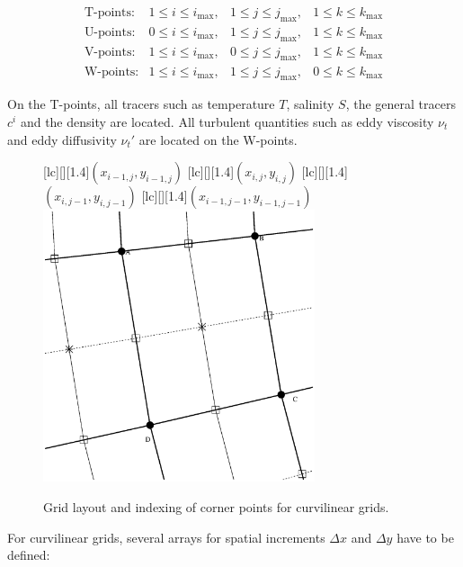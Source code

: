 \begin{equation}\label{imaxjmax}
\begin{array}{llll}
\mbox{T-points:} & 1 \leq i \leq i_{\max}, & 
                   1 \leq j \leq j_{\max}, &
		   1 \leq k \leq k_{\max} \\
\mbox{U-points:} & 0 \leq i \leq i_{\max}, & 
                   1 \leq j \leq j_{\max}, &
		   1 \leq k \leq k_{\max} \\
\mbox{V-points:} & 1 \leq i \leq i_{\max}, & 
                   0 \leq j \leq j_{\max}, &
		   1 \leq k \leq k_{\max} \\
\mbox{W-points:} & 1 \leq i \leq i_{\max}, & 
                   1 \leq j \leq j_{\max}, &
		   0 \leq k \leq k_{\max} 
\end{array}
\end{equation}

On the T-points, all tracers such as\label{TSfirst} 
temperature $T$, salinity $S$,
the general tracers $c^i$ and the density are located. All turbulent
quantities such as eddy viscosity $\nu_t$ and eddy diffusivity $\nu_t'$
are located on the W-points.


\begin{figure}
\begin{center}
[lc][][1.4]{$(x_{i-1,j},y_{i-1,j})$}
[lc][][1.4]{$(x_{i,j},y_{i,j})$}
[lc][][1.4]{$(x_{i,j-1},y_{i,j-1})$}
[lc][][1.4]{$(x_{i-1,j-1},y_{i-1,j-1})$}
\includegraphics[width=8cm,bbllx=50,bblly=50,bburx=543,bbury=556]{./figures/CurviDXDY.ps}
\caption{Grid layout and indexing of corner points for
curvilinear grids. }
\label{fighorgridCurvi}
\end{center}
\end{figure}

For curvilinear grids, several arrays for spatial
increments $\Delta x$ and $\Delta y$  have to be defined:  

